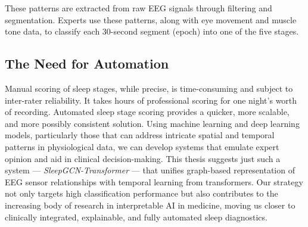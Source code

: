 These patterns are extracted from raw EEG signals through filtering and segmentation. Experts use these patterns, along with eye movement and muscle tone data, to classify each 30-second segment (epoch) into one of the five stages.

\subsection{The Need for Automation}
Manual scoring of sleep stages, while precise, is time-consuming and subject to inter-rater reliability. It takes hours of professional scoring for one night's worth of recording. Automated sleep stage scoring provides a quicker, more scalable, and more possibly consistent solution. Using machine learning and deep learning models, particularly those that can address intricate spatial and temporal patterns in physiological data, we can develop systems that emulate expert opinion and aid in clinical decision-making.
This thesis suggests just such a system — \textit{SleepGCN-Transformer} — that unifies graph-based representation of EEG sensor relationships with temporal learning from transformers. Our strategy not only targets high classification performance but also contributes to the increasing body of research in interpretable AI in medicine, moving us closer to clinically integrated, explainable, and fully automated sleep diagnostics.

